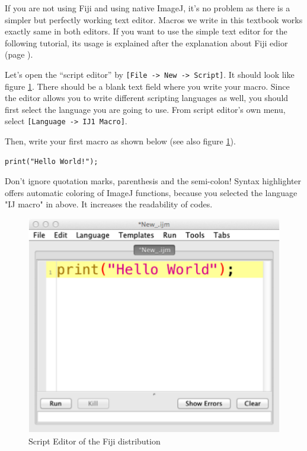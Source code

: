 \documentclass[11pt,a4paper,oneside]{report}
\newcommand{\ijmenu}[1]{\texttt{\small#1}}
\begin{document}
If you are not using Fiji and using native ImageJ, it's no problem as there is a simpler but perfectly working text editor. Macros we write in this textbook works exactly same in both editors. If you want to use the simple text editor for the following tutorial, its usage is explained after the explanation about Fiji edior (page \pageref{part:nativeeditor}).   

Let's open the ``script editor'' 
by \ijmenu{[File -> New -> Script]}. It should look like figure \ref{fig_ScriptEditor}.
There should be a blank text field where you write your macro. Since the editor allows you to write different scripting languages as well, you should first select the language you are going to use.  
From script editor's own menu, select \ijmenu{[Language -> IJ1 Macro]}. 

Then, write your first macro as shown below (see also figure \ref{fig_ScriptEditor}). \\
\begin{lstlisting}[numbers=none]
print("Hello World!");
\end{lstlisting}

Don't ignore quotation marks, parenthesis and the semi-colon! 
Syntax highlighter offers automatic coloring of ImageJ functions, because you selected the language "IJ macro" in above. It increases the readability of codes. 

\begin{figure}[hbtp]
\begin{center}
\includegraphics[scale=1.0]{fig/editor_helloworld_singleline.png}
\caption{Script Editor of the Fiji distribution} \label{fig_ScriptEditor}
\end{center}
\end{figure}
\end{document}
